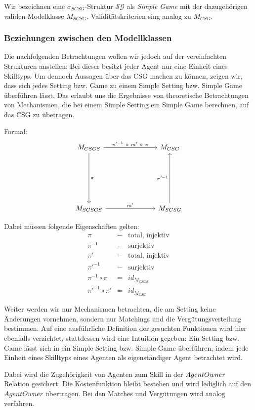 \noindent
Wir bezeichnen eine $\sigma_{SCSG}$-Struktur $\mathcal{SG}$ als \textit{Simple Game} mit der dazugehörigen validen Modelklasse $M_{SCSG}$. Validitätskriterien sing analog zu $M_{CSG}$.


\subsubsection{Beziehungen zwischen den Modellklassen}
\label{bez}

Die nachfolgenden Betrachtungen wollen wir jedoch auf der vereinfachten Strukturen anstellen: Bei  dieser besitzt jeder Agent nur eine Einheit eines Skilltyps. Um dennoch Aussagen über das CSG machen zu können, zeigen wir, dass sich jedes Setting bzw. Game zu einem Simple Setting bzw. Simple Game überführen lässt. Das erlaubt uns die Ergebnisse von theoretische Betrachtungen von Mechanismen, die bei einem Simple Setting ein Simple Game berechnen, auf das CSG zu übetragen.

\noindent
Formal:
\[
\begin{tikzcd}[column sep=1in,row sep=1in]
M_{CSGS} \arrow{d}{\pi} \arrow{r}{\pi'^{-1}\ \circ\  m'\ \circ\ \pi} & M_{CSG} \\
M_{SCSGS} \arrow{r}{m'} & M_{SCSG} \arrow{u}{\pi'^{-1}}
\end{tikzcd}
\]

\noindent
Dabei müssen folgende Eigenschaften gelten:
\begin{eqnarray}
  \pi &-&\text{total, injektiv} \\
  \pi^{-1}&-&\text{surjektiv} \\
  \pi' &-&\text{total, injektiv} \\
  \pi'^{-1}&-&\text{surjektiv} \\
  \pi^{-1}\circ\pi &=& id_{M_{CSGS}} \\
  \pi'^{-1}\circ\pi' &=& id_{M_{CSG}}
\end{eqnarray}

\noindent
Weiter werden wir nur Mechanismen betrachten, die am Setting keine Änderungen vornehmen, sondern nur Matchings und die Vergütungsverteilung bestimmen. Auf eine ausführliche Definition der gesuchten Funktionen wird hier ebenfalls verzichtet,  stattdessen wird eine Intuition gegeben: Ein Setting bzw. Game lässt sich in ein Simple Setting bzw. Simple Game überführen, indem jede Einheit eines Skilltyps eines Agenten als eigenständiger Agent betrachtet wird.

Dabei wird die Zugehörigkeit von Agenten zum Skill in der $Agent\-Owner$ Relation gesichert. Die Kostenfunktion bleibt bestehen und wird lediglich auf den $AgentOwner$ übertragen. Bei den Matches und Vergütungen wird analog verfahren.

